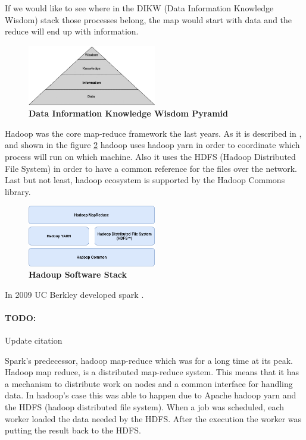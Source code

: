 If we would like to see where in the DIKW (Data Information Knowledge Wisdom) stack those processes belong, the map would start with data and the reduce will end up with information.



\begin{figure}[h]
	\centering
	\includegraphics[width=0.5\textwidth]{images/DIKW.png}
	\caption{\bfseries Data Information Knowledge Wisdom Pyramid \cite{TheWisdomHierachy:7}}
	\label{dikw}
\end{figure}

Hadoop was the core map-reduce framework the last years.
As it is described in \cite{Hadoop:9}, and shown in the figure \ref{hadoopStack} hadoop uses hadoop yarn in order to coordinate which process will run on which machine. Also it uses the HDFS (Hadoop Distributed File System) in order to have a common reference for the files over the network. Last but not least, hadoop ecosystem is supported by the Hadoop Commons library. 

\begin{figure}[h]
	\centering
	\includegraphics[width=0.5\textwidth]{images/hadoop-stack.png}
	\caption{\bfseries Hadoup Software Stack}
	\label{hadoopStack}
\end{figure}

 In 2009 UC Berkley developed spark \cite{DatabricsSpark:8}. \paragraph{TODO:} Update citation

Spark's predecessor, hadoop map-reduce which was for a long time at its peak. Hadoop map reduce, is a distributed map-reduce system. This means that it has a mechanism to distribute work on nodes and a common interface for handling data. In hadoop's case this was able to happen due to Apache hadoop yarn and the HDFS (hadoop distributed file system). When a job was scheduled, each worker loaded the data needed by the HDFS. After the execution the worker was putting the result back to the HDFS.


